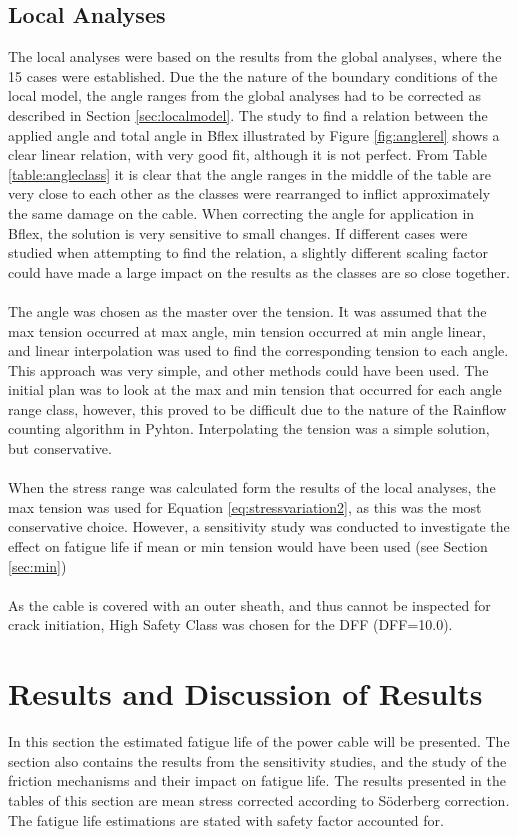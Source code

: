 \subsection{Local Analyses}
The local analyses were based on the results from the global analyses, where the 15 cases were established. Due the the nature of the boundary conditions of the local model, the angle ranges from the global analyses had to be corrected as described in Section \ref{sec:localmodel}. The study to find a relation between the applied angle and total angle in Bflex illustrated by Figure \ref{fig:anglerel} shows a clear linear relation, with very good fit, although it is not perfect. From Table \ref{table:angleclass} it is clear that the angle ranges in the middle of the table are very close to each other as the classes were rearranged to inflict approximately the same damage on the cable. When correcting the angle for application in Bflex, the solution is very sensitive to small changes. If different cases were studied when attempting to find the relation, a slightly different scaling factor could have made a large impact on the results as the classes are so close together.\\\\
The angle was chosen as the master over the tension. It was assumed that the max tension occurred at max angle, min tension occurred at min angle linear, and linear interpolation was used to find the corresponding tension to each angle. This approach was very simple, and other methods could have been used. The initial plan was to look at the max and min tension that occurred for each angle range class, however, this proved to be difficult due to the nature of the Rainflow counting algorithm in Pyhton. Interpolating the tension was a simple solution, but conservative.\\\\
When the stress range was calculated form the results of the local analyses, the max tension was used for Equation \ref{eq:stressvariation2}, as this was the most conservative choice. However, a sensitivity study was conducted to investigate the effect on fatigue life if mean or min tension would have been used (see Section \ref{sec:min})\\\\ As the cable is covered with an outer sheath, and thus cannot be inspected for crack initiation, High Safety Class was chosen for the DFF (DFF=10.0). 
\section{Results and Discussion of Results}
In this section the estimated fatigue life of the power cable will be presented. The section also contains the results from the sensitivity studies, and the study of the friction mechanisms and their impact on fatigue life. The results presented in the tables of this section are mean stress corrected according to Söderberg correction. The fatigue life estimations are stated with safety factor accounted for.\\\\


